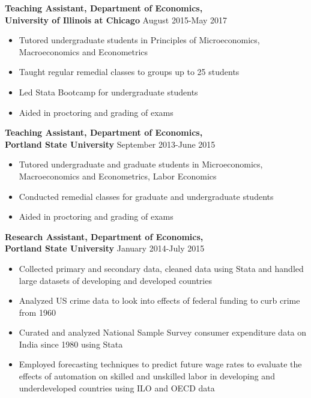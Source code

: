 \documentclass[10pt]{article}
\newenvironment{innerlist}[1][\enskip\textbullet]%
        {\begin{itemize}[#1,leftmargin=*,parsep=0pt,itemsep=0pt,topsep=0pt,partopsep=0pt]}
        {\end{itemize}}
\begin{document}
\textbf{Teaching Assistant, Department of Economics,}\\
\textbf{University of Illinois at Chicago} \hfill {August 2015-May 2017}
\vspace{.1in}

\begin{innerlist}
\item Tutored undergraduate students in Principles of Microeconomics, Macroeconomics and Econometrics
\item Taught regular remedial classes to groups up to 25 students
\item Led Stata Bootcamp for undergraduate students 
\item Aided in proctoring and grading of exams
\end{innerlist}
\vspace{.1in}

\textbf{Teaching Assistant, Department of Economics,}\\
\textbf{Portland State University} \hfill {September 2013-June 2015}
\vspace{.1in}
\begin{innerlist}
\item Tutored undergraduate and graduate students in Microeconomics, Macroeconomics and Econometrics, Labor Economics
\item Conducted remedial classes for graduate and undergraduate students 
\item Aided in proctoring and grading of exams
\end{innerlist}
\vspace{.1in}

\textbf{Research Assistant, Department of Economics,}\\ 
\textbf{Portland State University} \hfill {January 2014-July 2015}
\vspace{.1in}

\begin{innerlist}
\item
Collected primary and secondary data, cleaned data using Stata and handled large datasets of developing and developed countries
\item Analyzed US crime data to look into effects of federal funding to curb crime from 1960
\item Curated and analyzed National Sample Survey consumer expenditure data on India since 1980 using Stata
\item Employed forecasting techniques to predict future wage rates to evaluate the effects of automation on skilled and unskilled labor in developing and underdeveloped countries using ILO and OECD data
\end{innerlist}
\vspace{.1in}
\end{document}

